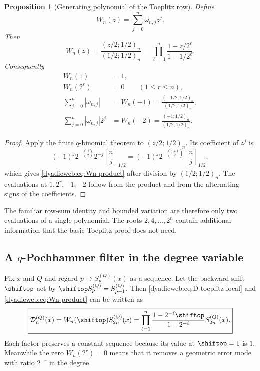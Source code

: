 \documentclass[11pt,oneside]{article}
\newtheorem{proposition}[theorem]{Proposition}
\theoremstyle{definition}
\theoremstyle{remark}
\newcommand{\qbinom}[3]{\genfrac{[}{]}{0pt}{}{#1}{#2}_{#3}}
\begin{document}
\begin{proposition}[Generating polynomial of the Toeplitz row]
\label{dyadicweb:prop:Wn}
Define
\begin{equation}
 W_n(z)=\sum_{j=0}^{n}\omega_{n,j}z^j.                    \label{dyadicweb:eq:Wn-def}
\end{equation}
Then
\begin{equation}
 \boxed{
 W_n(z)=\frac{(z/2;1/2)_n}{(1/2;1/2)_n}
 =\prod_{\ell=1}^{n}\frac{1-z/2^\ell}{1-1/2^\ell}.}      \label{dyadicweb:eq:Wn-product}
\end{equation}
Consequently
\begin{align}
 W_n(1)&=1,                                                \label{dyadicweb:eq:Wn-one}\\
 W_n(2^r)&=0\qquad(1\le r\le n),                         \label{dyadicweb:eq:Wn-roots}\\
 \sum_{j=0}^{n}|\omega_{n,j}|
 &=W_n(-1)=\frac{(-1/2;1/2)_n}{(1/2;1/2)_n},              \label{dyadicweb:eq:Wn-variation}\\
 \sum_{j=0}^{n}|\omega_{n,j}|2^j
 &=W_n(-2)=\frac{(-1;1/2)_n}{(1/2;1/2)_n}.                \label{dyadicweb:eq:Wn-weighted-variation}
\end{align}
\end{proposition}

\begin{proof}
Apply the finite $q$-binomial theorem to $(z/2;1/2)_n$.  Its coefficient of $z^j$ is
\[
 (-1)^j2^{-\binom j2}2^{-j}\qbinom nj{1/2}
 =(-1)^j2^{-\binom{j+1}{2}}\qbinom nj{1/2},
\]
which gives \eqref{dyadicweb:eq:Wn-product} after division by $(1/2;1/2)_n$.  The evaluations at
$1,2^r,-1,-2$ follow from the product and from the alternating signs of the coefficients.
\end{proof}

The familiar row-sum identity and bounded variation are therefore only two evaluations of a
single polynomial.  The roots $2,4,\ldots,2^n$ contain additional information that the basic
Toeplitz proof does not need.

\subsection[A q-Pochhammer filter in the degree variable]{A $q$-Pochhammer filter in the degree variable}

Fix $x$ and $Q$ and regard $p\mapsto S_p^{(Q)}(x)$ as a sequence.  Let the backward shift
$\shiftop$ act by
\(
 \shiftop S_p^{(Q)}=S_{p-1}^{(Q)}.
\)
Then \eqref{dyadicweb:eq:D-toeplitz-local} and \eqref{dyadicweb:eq:Wn-product} can be written as
\begin{equation}
 \boxed{
 \mathcal D_n^{(Q)}(x)
 =W_n(\shiftop)S_{2n}^{(Q)}(x)
 =\prod_{\ell=1}^{n}
   \frac{1-2^{-\ell}\shiftop}{1-2^{-\ell}}
   S_{2n}^{(Q)}(x).}                                      \label{dyadicweb:eq:q-filter-operator}
\end{equation}
Each factor preserves a constant sequence because its value at $\shiftop=1$ is $1$.
Meanwhile the zero $W_n(2^r)=0$ means that it removes a geometric error mode with ratio
$2^{-r}$ in the degree.
\end{document}
